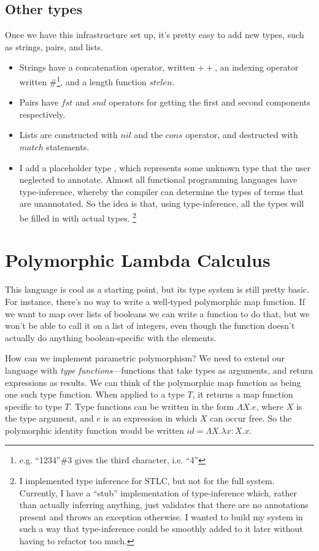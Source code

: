 \documentclass[pageno]{jpaper}
\begin{document}
{\subsection{Other types}
Once we have this infrastructure set up, it's pretty easy to add new types, such as strings, pairs, and lists.
\begin{itemize}
\item Strings have a concatenation operator, written $++$, an indexing operator written \#\footnote{e.g. ``1234''\#3 gives the third
character, i.e. ``4''}, and a length function $strlen$.
\item Pairs have $fst$ and $snd$ operators for getting the first and second components respectively.
\item Lists are constructed with $nil$ and the $cons$ operator, and destructed with $match$ statements.
\item I add a placeholder type , which represents some unknown type that the user
neglected to annotate. Almost all functional
programming languages have type-inference, whereby the compiler can determine the types of terms that
are unannotated. So the idea is that, using type-inference, all the  types will be filled
in with actual types. \footnote{I implemented type inference for STLC, but not for the full system. Currently,
I have a ``stub'' implementation of type-inference which, rather than actually inferring anything, just
validates that there are no  annotations present and throws an exception otherwise. I wanted
to build my system in such a way that type-inference could be smoothly added to it later without having to
refactor too much.}
\end{itemize}

\section{Polymorphic Lambda Calculus}
This language is cool as a starting point, but its type system is still pretty basic.
For instance, there's no way to write a well-typed polymorphic map function. If we want to map over lists of
booleans we can write a function to do that, but we won't be able to call it on a list of integers,
even though the function doesn't actually do anything boolean-specific with the elements.

How can we implement parametric polymorphism? We need to extend our language with \textit{type functions}---functions that take types as arguments, and return expressions as results. 
We can think of the polymorphic map function as being one such type function. When applied to a type $T$, it
returns a map function specific to type $T$.
Type functions can be written in the form $\Lambda X.e$, where $X$ is the type argument,
and $e$ is an expression in which $X$ can occur free. So the polymorphic identity function would be
written $id = \Lambda X.\lambda x:X.x$.

}
\end{document}
